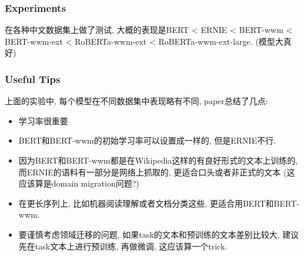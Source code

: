 \documentclass{article}
\begin{document}
\subsubsection{Experiments}

在各种中文数据集上做了测试, 大概的表现是BERT < ERNIE < BERT-wwm < BERT-wwm-ext < RoBERTa-wwm-ext < RoBERTa-wwm-ext-large.
(模型大真好)

\subsubsection{Useful Tips}

上面的实验中, 每个模型在不同数据集中表现略有不同, paper总结了几点:

\begin{itemize}
    \item 学习率很重要
    \item BERT和BERT-wwm的初始学习率可以设置成一样的, 但是ERNIE不行.
    \item 因为BERT和BERT-wwm都是在Wikipedia这样的有良好形式的文本上训练的, 而ERNIE的语料有一部分是网络上抓取的, 更适合口头或者非正式的文本
    (这应该算是domain migration问题?)
    \item 在更长序列上, 比如机器阅读理解或者文档分类这些, 更适合用BERT和BERT-wwm.
    \item 要谨慎考虑领域迁移的问题, 如果task的文本和预训练的文本差别比较大, 建议先在task文本上进行预训练, 再做微调, 这应该算一个trick.
\end{itemize}
\end{document}
